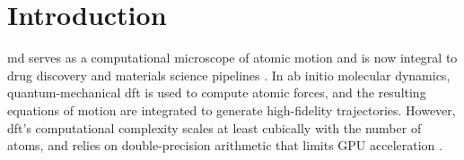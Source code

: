 


\section{Introduction}   
\glsresetall

        
        
    

\Gls{md} serves as a computational microscope of atomic motion and is now integral to drug discovery and materials science pipelines \cite{dror_biomolecular_2012, de_vivo_role_2016}. In ab initio molecular dynamics, quantum-mechanical \gls{dft} is used to compute atomic forces, and the resulting equations of motion are integrated to generate high-fidelity trajectories. However, \gls{dft}'s computational complexity scales at least cubically with the number of atoms, and relies on double-precision arithmetic that limits GPU acceleration \cite{kresse_efficiency_1996, stein_double-hybrid_2020, li_scaling_2024}. 

